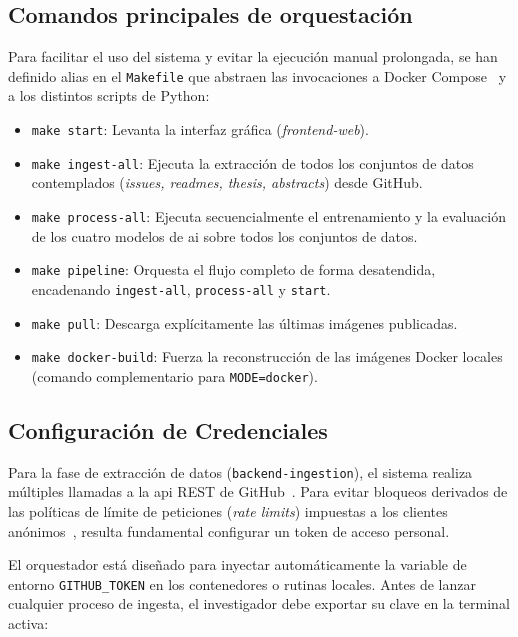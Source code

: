 \subsection{Comandos principales de orquestación}
Para facilitar el uso del sistema y evitar la ejecución manual prolongada, se
han definido alias en el \texttt{Makefile} que abstraen las invocaciones a
Docker Compose~\cite{DockerManuals} y a los distintos scripts de Python:
\begin{itemize}
    \item \texttt{make start}: Levanta la interfaz gráfica (\textit{frontend-web}).
    \item \texttt{make ingest-all}: Ejecuta la extracción de todos los conjuntos de datos contemplados (\textit{issues, readmes, thesis, abstracts}) desde GitHub.
    \item \texttt{make process-all}: Ejecuta secuencialmente el entrenamiento y la evaluación de los cuatro modelos de \acrshort{ai} sobre todos los conjuntos de datos.
    \item \texttt{make pipeline}: Orquesta el flujo completo de forma desatendida, encadenando \texttt{ingest-all}, \texttt{process-all} y \texttt{start}.
    \item \texttt{make pull}: Descarga explícitamente las últimas imágenes publicadas.
    \item \texttt{make docker-build}: Fuerza la reconstrucción de las imágenes Docker locales (comando complementario para \texttt{MODE=docker}).
\end{itemize}


\subsection{Configuración de Credenciales}
Para la fase de extracción de datos (\texttt{backend-ingestion}), el sistema
realiza múltiples llamadas a la \acrshort{api} REST de
GitHub~\cite{GitHubRestDocs}. Para evitar bloqueos derivados de las políticas
de límite de peticiones (\textit{rate limits}) impuestas a los clientes
anónimos~\cite{GitHubRateLimitDocs}, resulta fundamental configurar un token de
acceso personal.

El orquestador está diseñado para inyectar automáticamente la variable de
entorno \texttt{GITHUB\_TOKEN} en los contenedores o rutinas locales. Antes de
lanzar cualquier proceso de ingesta, el investigador debe exportar su clave en
la terminal activa:

